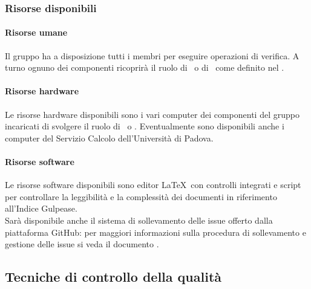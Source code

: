 \documentclass[../PianoDiQualifica.tex]{subfiles}
\begin{document}
		    \subsubsection{Risorse disponibili}
			    \paragraph{Risorse umane}
			    Il gruppo ha a disposizione tutti i membri per eseguire operazioni di verifica. A turno ognuno dei componenti ricoprirà il ruolo di \responsabilediprogetto\ o di \verificatore\ come definito nel \pianodiprogettov.
			    \paragraph{Risorse hardware}
			    Le risorse hardware disponibili sono i vari computer dei componenti del gruppo incaricati di svolgere il ruolo di \responsabilediprogetto\ o \verificatore. Eventualmente sono disponibili anche i computer del Servizio Calcolo dell'Università di Padova.
				\paragraph{Risorse software}
				Le risorse software disponibili sono editor \LaTeX \ con controlli integrati e script per controllare la leggibilità e la complessità dei documenti in riferimento all'Indice Gulpease.\\
				Sarà disponibile anche il sistema di sollevamento delle issue offerto dalla piattaforma GitHub: per maggiori informazioni sulla procedura di sollevamento e gestione delle issue si veda il documento \normediprogettov.
		\subsection{Tecniche di controllo della qualità}
\end{document}
